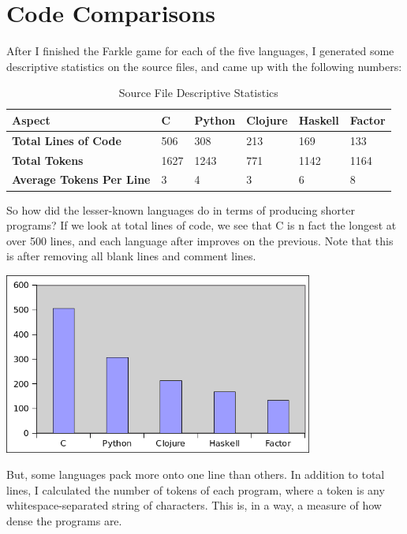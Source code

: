 \documentclass{article}
\begin{document}
\section{Code Comparisons}

After I finished the Farkle game for each of the five languages, I generated
some descriptive statistics on the source files, and came up with the following
numbers:

\begin{table}[h]
    \caption{Source File Descriptive Statistics}
    \begin{tabular}{|p{1.7in}|p{0.3in}|p{0.5in}|p{0.5in}|p{0.5in}|p{0.5in}|}
        \hline
        {\bf Aspect} & {\bf C} & {\bf Python} & {\bf Clojure} & {\bf Haskell} & {\bf Factor} \\
        \hline
        {\bf Total Lines of Code} & 506 & 308 & 213 & 169 & 133 \\
        \hline
        {\bf Total Tokens} & 1627 & 1243 & 771 & 1142 & 1164 \\
        \hline
        {\bf Average Tokens Per Line} & 3 & 4 & 3 & 6 & 8 \\
        \hline
    \end{tabular}
\end{table}

So how did the lesser-known languages do in terms of producing shorter programs?
If we look at total lines of code, we see that C is n fact the longest at over
500 lines, and each language after improves on the previous.  Note that this is
after removing all blank lines and comment lines.

\includegraphics[width=4in]{graphs/total-lines-of-code.png}

But, some languages pack more onto one line than others.  In addition to total
lines, I calculated the number of tokens of each program, where a token is any
whitespace-separated string of characters.  This is, in a way, a measure of how
dense the programs are. 
\end{document}
